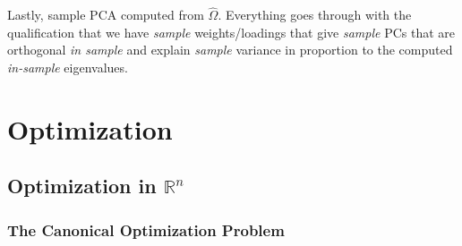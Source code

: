 \documentclass[12pt]{book}
\numberwithin{equation}{section} %
\theoremstyle{plain}
\theoremstyle{definition}
\theoremstyle{remark}
\newcommand{\Rn}{\mathbb{R}^n}
\begin{document}
Lastly, sample PCA computed from $\hat{\Omega}$.
Everything goes through with the qualification
that we have \emph{sample} weights/loadings that give \emph{sample} PCs
that are orthogonal \emph{in sample} and explain \emph{sample} variance
in proportion to the computed \emph{in-sample} eigenvalues.





\chapter{Optimization}

\section{Optimization in $\Rn$}

\subsection{The Canonical Optimization Problem}
\end{document}

